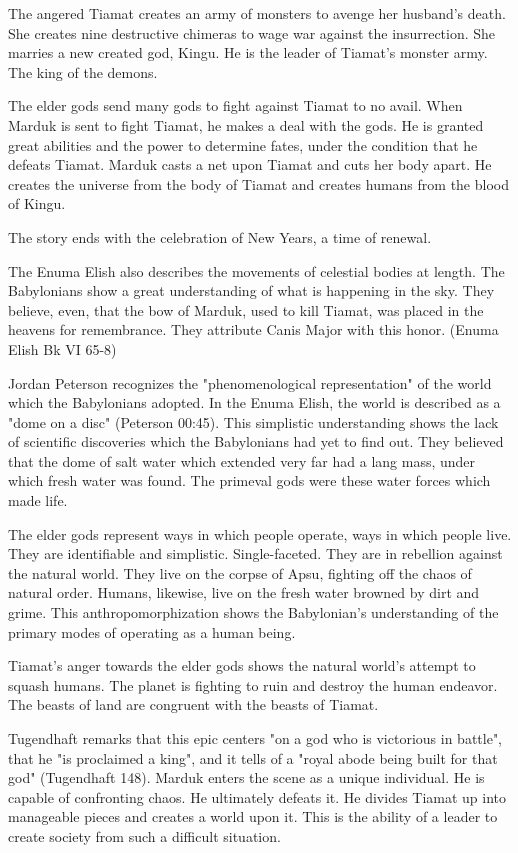 \documentclass[12pt,a4paper,english]{article}
\begin{document}
The angered Tiamat creates an army of monsters to avenge her husband's death. 
She creates nine destructive chimeras to wage war against the insurrection. 
She marries a new created god, Kingu. 
He is the leader of Tiamat's monster army. 
The king of the demons.

The elder gods send many gods to fight against Tiamat to no avail. 
When Marduk is sent to fight Tiamat, he makes a deal with the gods. 
He is granted great abilities and the power to determine fates, under the condition that he defeats Tiamat.
Marduk casts a net upon Tiamat and cuts her body apart.
He creates the universe from the body of Tiamat and creates humans from the blood of Kingu. 

The story ends with the celebration of New Years, a time of renewal.

The Enuma Elish also describes the movements of celestial bodies at length. The Babylonians show a great understanding of what is happening in the sky. They believe, even, that the bow of Marduk, used to kill Tiamat, was placed in the heavens for remembrance. They attribute Canis Major with this honor. (Enuma Elish Bk VI 65-8)

Jordan Peterson recognizes the "phenomenological representation" of the world which the Babylonians adopted. 
In the Enuma Elish, the world is described as a "dome on a disc" (Peterson 00:45).
This simplistic understanding shows the lack of scientific discoveries which the Babylonians had yet to find out. 
They believed that the dome of salt water which extended very far had a lang mass, under which fresh water was found.
The primeval gods were these water forces which made life. 

The elder gods represent ways in which people operate, ways in which people live. 
They are identifiable and simplistic. 
Single-faceted.
They are in rebellion against the natural world.
They live on the corpse of Apsu, fighting off the chaos of natural order.
Humans, likewise, live on the fresh water browned by dirt and grime.
This anthropomorphization shows the Babylonian's understanding of the primary modes of operating as a human being.

Tiamat's anger towards the elder gods shows the natural world's attempt to squash humans. 
The planet is fighting to ruin and destroy the human endeavor.
The beasts of land are congruent with the beasts of Tiamat. 

Tugendhaft remarks that this epic centers "on a god who is victorious in battle", that he "is proclaimed a king", and it tells of a "royal abode being built for that god" (Tugendhaft 148).
Marduk enters the scene as a unique individual.
He is capable of confronting chaos.
He ultimately defeats it.
He divides Tiamat up into manageable pieces and creates a world upon it.
This is the ability of a leader to create society from such a difficult situation. 
\end{document}
